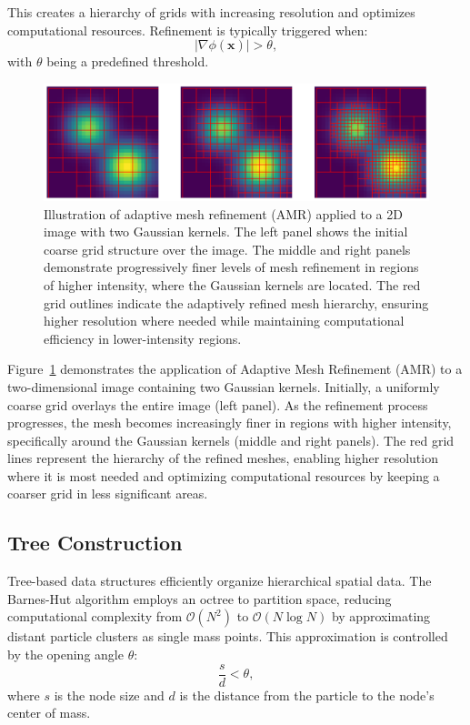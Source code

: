 This creates a hierarchy of grids with increasing resolution and optimizes computational resources. Refinement is typically triggered when: 
\begin{equation}
    \left| \nabla \phi(\mathbf{x}) \right| > \theta,
\end{equation}
with $\theta$ being a predefined threshold.

\begin{figure}
    \centering
    \includegraphics[width=\textwidth]{figures/adaptive_mesh_refinement.png}
    \caption[Illustration of adaptive mesh refinement]{Illustration of adaptive mesh refinement (AMR) applied to a 2D image with two Gaussian kernels. The left panel shows the initial coarse grid structure over the image. The middle and right panels demonstrate progressively finer levels of mesh refinement in regions of higher intensity, where the Gaussian kernels are located. The red grid outlines indicate the adaptively refined mesh hierarchy, ensuring higher resolution where needed while maintaining computational efficiency in lower-intensity regions.}
    \label{fig:amr}
\end{figure}
Figure~\ref{fig:amr} demonstrates the application of Adaptive Mesh Refinement (AMR) to a two-dimensional image containing two Gaussian kernels. Initially, a uniformly coarse grid overlays the entire image (left panel). As the refinement process progresses, the mesh becomes increasingly finer in regions with higher intensity, specifically around the Gaussian kernels (middle and right panels). The red grid lines represent the hierarchy of the refined meshes, enabling higher resolution where it is most needed and optimizing computational resources by keeping a coarser grid in less significant areas.

\subsection{Tree Construction}
Tree-based data structures efficiently organize hierarchical spatial data. The Barnes-Hut algorithm employs an octree to partition space, reducing computational complexity from $\mathcal{O}(N^2)$ to $\mathcal{O}(N \log N)$ by approximating distant particle clusters as single mass points. This approximation is controlled by the opening angle $\theta$:
\begin{equation}
    \frac{s}{d} < \theta,
\end{equation}
where $s$ is the node size and $d$ is the distance from the particle to the node's center of mass.

